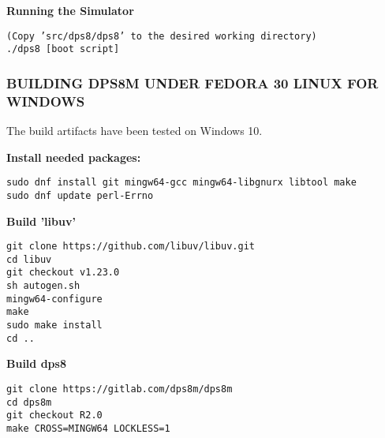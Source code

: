 \textbf{Running the Simulator}

\begin{adjustwidth}{5ex}{1ex}
    \texttt{(Copy 'src/dps8/dps8' to the desired working directory)} \\
    \texttt{./dps8 [boot script]} \\
\end{adjustwidth}  

\newpage

\subsubsection[Building dps8m under Fedora 30 Linux For Windows]{BUILDING DPS8M UNDER FEDORA 30 LINUX FOR WINDOWS}

The build artifacts have been tested on Windows 10.

\textbf{Install needed packages:}

\begin{adjustwidth}{5ex}{1ex}
	\texttt{sudo dnf install git mingw64-gcc mingw64-libgnurx libtool make} \\
    \texttt{sudo dnf update perl-Errno} \\
\end{adjustwidth}  

\textbf{Build 'libuv'}

\begin{adjustwidth}{5ex}{1ex}
    \texttt{git clone https://github.com/libuv/libuv.git} \\
    \texttt{cd libuv} \\
    \texttt{git checkout v1.23.0} \\
    \texttt{sh autogen.sh} \\
    \texttt{mingw64-configure} \\
    \texttt{make} \\
    \texttt{sudo make install} \\
    \texttt{cd ..} \\
\end{adjustwidth}  

\textbf{Build dps8}

\begin{adjustwidth}{5ex}{1ex}
    \texttt{git clone https://gitlab.com/dps8m/dps8m} \\
    \texttt{cd dps8m} \\
    \texttt{git checkout R2.0} \\
    \texttt{make CROSS=MINGW64 LOCKLESS=1} \\
\end{adjustwidth}  

